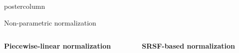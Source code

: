 \documentclass[final, size=a0]{beamer}
\begin{document}
\begin{frame}
\begin{columns}
\begin{column}{.33\textwidth}
\begin{beamercolorbox}[center,wd=\textwidth]{postercolumn}
\begin{minipage}[T]{.95\textwidth}
{            %
            \begin{alertblock}{Non-parametric normalization}

              \begin{columns}
                \begin{column}{.5\textwidth}
                  \begin{center}
                    \textbf{Piecewise-linear normalization}
                  \end{center}
                \end{column}
                \begin{column}{.5\textwidth}
                  \begin{center}
                    \textbf{SRSF-based normalization}
                  \end{center}
                \end{column}
              \end{columns}
              

\end{alertblock}}
\end{minipage}
\end{beamercolorbox}
\end{column}
\end{columns}
\end{frame}
\end{document}
